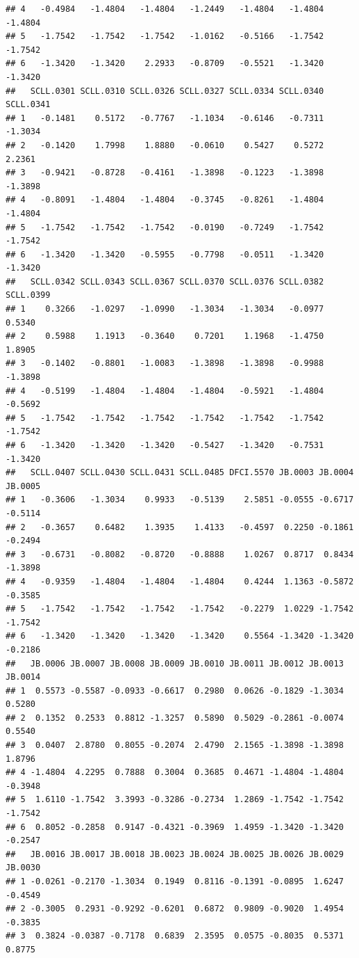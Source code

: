 \documentclass[
]{article}
\begin{document}
\begin{verbatim}
## 4   -0.4984   -1.4804   -1.4804   -1.2449   -1.4804   -1.4804   -1.4804
## 5   -1.7542   -1.7542   -1.7542   -1.0162   -0.5166   -1.7542   -1.7542
## 6   -1.3420   -1.3420    2.2933   -0.8709   -0.5521   -1.3420   -1.3420
##   SCLL.0301 SCLL.0310 SCLL.0326 SCLL.0327 SCLL.0334 SCLL.0340 SCLL.0341
## 1   -0.1481    0.5172   -0.7767   -1.1034   -0.6146   -0.7311   -1.3034
## 2   -0.1420    1.7998    1.8880   -0.0610    0.5427    0.5272    2.2361
## 3   -0.9421   -0.8728   -0.4161   -1.3898   -0.1223   -1.3898   -1.3898
## 4   -0.8091   -1.4804   -1.4804   -0.3745   -0.8261   -1.4804   -1.4804
## 5   -1.7542   -1.7542   -1.7542   -0.0190   -0.7249   -1.7542   -1.7542
## 6   -1.3420   -1.3420   -0.5955   -0.7798   -0.0511   -1.3420   -1.3420
##   SCLL.0342 SCLL.0343 SCLL.0367 SCLL.0370 SCLL.0376 SCLL.0382 SCLL.0399
## 1    0.3266   -1.0297   -1.0990   -1.3034   -1.3034   -0.0977    0.5340
## 2    0.5988    1.1913   -0.3640    0.7201    1.1968   -1.4750    1.8905
## 3   -0.1402   -0.8801   -1.0083   -1.3898   -1.3898   -0.9988   -1.3898
## 4   -0.5199   -1.4804   -1.4804   -1.4804   -0.5921   -1.4804   -0.5692
## 5   -1.7542   -1.7542   -1.7542   -1.7542   -1.7542   -1.7542   -1.7542
## 6   -1.3420   -1.3420   -1.3420   -0.5427   -1.3420   -0.7531   -1.3420
##   SCLL.0407 SCLL.0430 SCLL.0431 SCLL.0485 DFCI.5570 JB.0003 JB.0004 JB.0005
## 1   -0.3606   -1.3034    0.9933   -0.5139    2.5851 -0.0555 -0.6717 -0.5114
## 2   -0.3657    0.6482    1.3935    1.4133   -0.4597  0.2250 -0.1861 -0.2494
## 3   -0.6731   -0.8082   -0.8720   -0.8888    1.0267  0.8717  0.8434 -1.3898
## 4   -0.9359   -1.4804   -1.4804   -1.4804    0.4244  1.1363 -0.5872 -0.3585
## 5   -1.7542   -1.7542   -1.7542   -1.7542   -0.2279  1.0229 -1.7542 -1.7542
## 6   -1.3420   -1.3420   -1.3420   -1.3420    0.5564 -1.3420 -1.3420 -0.2186
##   JB.0006 JB.0007 JB.0008 JB.0009 JB.0010 JB.0011 JB.0012 JB.0013 JB.0014
## 1  0.5573 -0.5587 -0.0933 -0.6617  0.2980  0.0626 -0.1829 -1.3034  0.5280
## 2  0.1352  0.2533  0.8812 -1.3257  0.5890  0.5029 -0.2861 -0.0074  0.5540
## 3  0.0407  2.8780  0.8055 -0.2074  2.4790  2.1565 -1.3898 -1.3898  1.8796
## 4 -1.4804  4.2295  0.7888  0.3004  0.3685  0.4671 -1.4804 -1.4804 -0.3948
## 5  1.6110 -1.7542  3.3993 -0.3286 -0.2734  1.2869 -1.7542 -1.7542 -1.7542
## 6  0.8052 -0.2858  0.9147 -0.4321 -0.3969  1.4959 -1.3420 -1.3420 -0.2547
##   JB.0016 JB.0017 JB.0018 JB.0023 JB.0024 JB.0025 JB.0026 JB.0029 JB.0030
## 1 -0.0261 -0.2170 -1.3034  0.1949  0.8116 -0.1391 -0.0895  1.6247 -0.4549
## 2 -0.3005  0.2931 -0.9292 -0.6201  0.6872  0.9809 -0.9020  1.4954 -0.3835
## 3  0.3824 -0.0387 -0.7178  0.6839  2.3595  0.0575 -0.8035  0.5371  0.8775

\end{verbatim}
\end{document}
